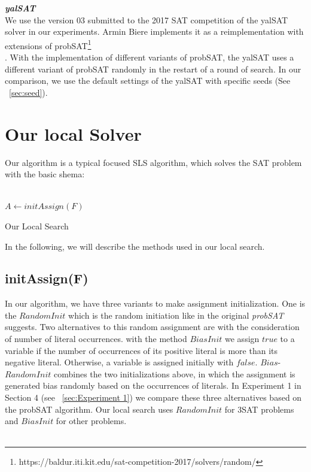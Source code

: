 \documentclass[12pt,a4paper,twoside]{scrartcl}
\numberwithin{equation}{section}
\begin{document}
\emph{\textbf{yalSAT}}\\
We use the version 03 submitted to the 2017 SAT competition of the yalSAT solver in our experiments. Armin Biere implements it as a reimplementation with extensions of probSAT\footnote{https://baldur.iti.kit.edu/sat-competition-2017/solvers/random/}\\.  With the implementation of different variants of probSAT, the yalSAT uses a different variant of probSAT randomly in the restart of a round of search. In our comparison, we use the default settings of the yalSAT with specific seeds (See ~\ref{sec:seed}).
\clearpage
\section{Our local Solver}
\label{sec:local}
 Our algorithm is a typical focused SLS algorithm, which solves the SAT problem with the basic shema:\\
\\
\begin{algorithm}[H]
  $A \leftarrow initAssign(F)$ \;
 \caption{Our Local Search}
\end{algorithm}
 In the following, we will describe the methods used in our local search.\\
\subsection{initAssign(F)}
In our algorithm, we have three variants to make assignment initialization.
One is the $RandomInit$ which is the random initiation like in the original \emph{probSAT} suggests. Two alternatives to this random assignment are with the consideration of number of literal occurrences. with the method $BiasInit$ we assign $true$ to a variable if the number of occurrences of its positive literal is more than its negative literal. Otherwise, a variable is assigned initially with $false$. $Bias$-$RandomInit$ combines the two initializations above, in which the assignment is generated bias randomly based on the occurrences of literals.  In Experiment 1 in Section 4 (see ~\ref{sec:Experiment 1}) we compare these three alternatives based on the probSAT algorithm. Our local search uses $RandomInit$ for 3SAT problems and $BiasInit$ for other problems.\\
\\
\end{document}
